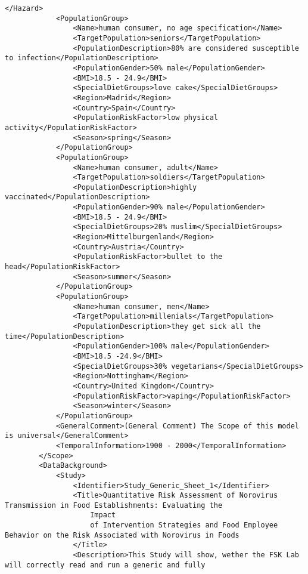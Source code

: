 \begin{lstlisting}[language=RAKIP, caption={Example of DoseResponseModel}]
            </Hazard>
            <PopulationGroup>
                <Name>human consumer, no age specification</Name>
                <TargetPopulation>seniors</TargetPopulation>
                <PopulationDescription>80% are considered susceptible to infection</PopulationDescription>
                <PopulationGender>50% male</PopulationGender>
                <BMI>18.5 - 24.9</BMI>
                <SpecialDietGroups>love cake</SpecialDietGroups>
                <Region>Madrid</Region>
                <Country>Spain</Country>
                <PopulationRiskFactor>low physical activity</PopulationRiskFactor>
                <Season>spring</Season>
            </PopulationGroup>
            <PopulationGroup>
                <Name>human consumer, adult</Name>
                <TargetPopulation>soldiers</TargetPopulation>
                <PopulationDescription>highly vaccinated</PopulationDescription>
                <PopulationGender>90% male</PopulationGender>
                <BMI>18.5 - 24.9</BMI>
                <SpecialDietGroups>20% muslim</SpecialDietGroups>
                <Region>Mittelburgenland</Region>
                <Country>Austria</Country>
                <PopulationRiskFactor>bullet to the head</PopulationRiskFactor>
                <Season>summer</Season>
            </PopulationGroup>
            <PopulationGroup>
                <Name>human consumer, men</Name>
                <TargetPopulation>millenials</TargetPopulation>
                <PopulationDescription>they get sick all the time</PopulationDescription>
                <PopulationGender>100% male</PopulationGender>
                <BMI>18.5 -24.9</BMI>
                <SpecialDietGroups>30% vegetarians</SpecialDietGroups>
                <Region>Nottingham</Region>
                <Country>United Kingdom</Country>
                <PopulationRiskFactor>vaping</PopulationRiskFactor>
                <Season>winter</Season>
            </PopulationGroup>
            <GeneralComment>(General Comment) The Scope of this model is universal</GeneralComment>
            <TemporalInformation>1900 - 2000</TemporalInformation>
        </Scope>
        <DataBackground>
            <Study>
                <Identifier>Study_Generic_Sheet_1</Identifier>
                <Title>Quantitative Risk Assessment of Norovirus Transmission in Food Establishments: Evaluating the
                    Impact
                    of Intervention Strategies and Food Employee Behavior on the Risk Associated with Norovirus in Foods
                </Title>
                <Description>This Study will show, wether the FSK Lab will correctly read and run a generic and fully

\end{lstlisting}
